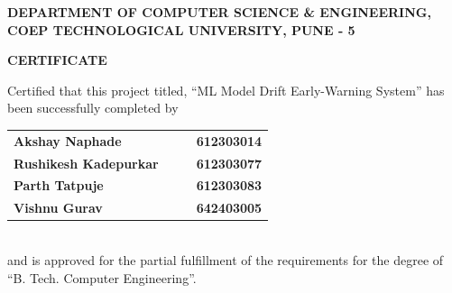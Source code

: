 %
\thispagestyle{empty}
\linespread{2}
\begin{center}			%
	\large{\bf{DEPARTMENT OF COMPUTER SCIENCE \& ENGINEERING,\\
	      COEP TECHNOLOGICAL UNIVERSITY, PUNE - 5\\}}
\end{center}

\vspace{20pt}			%

\begin{center}
	\Large{\bf{CERTIFICATE\\}}
\end{center}

\vspace{20pt}

\linespread{1.5}			%
\selectfont
\large{
Certified that this project titled, ``ML Model Drift Early-Warning System''
has been successfully completed by \\
\begin{table}[htbp]
	\begin{center}
	\begin{tabular}{ l c c l }
	\Large\bf{Akshay Naphade} & & & \Large\bf{612303014} \\ [0.3cm]
	\Large\bf{Rushikesh Kadepurkar} & & & \Large\bf{612303077} \\ [0.3cm]
	\Large\bf{Parth Tatpuje} & & & \Large\bf{612303083} \\ [0.3cm]
	\Large\bf{Vishnu Gurav} & & & \Large\bf{642403005} \\
	\end{tabular}
	\end{center}
	\end{table} \\
and is approved for the partial fulfillment of the requirements for the degree of
``B. Tech. Computer Engineering''.
}

\vspace{60pt}

